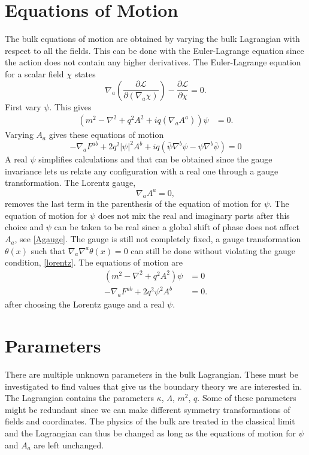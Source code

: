 \documentclass[12pt]{report}
\renewcommand{\i}{\ensuremath{i}}
\begin{document}
\section{Equations of Motion}
The bulk equations of motion are obtained by varying the bulk Lagrangian with respect to all the fields. This can be done with the Euler-Lagrange equation since the action does not contain any higher derivatives. The Euler-Lagrange equation for a scalar field $\chi$ states
\begin{equation}
 \nabla_a\left(\frac{\partial\mathcal{L}}{\partial(\nabla_a\chi)}\right)-\frac{\partial\mathcal{L}}{\partial\chi}=0.
\end{equation}
First vary $\psi$. This gives
\begin{equation}
\begin{split}
\left(m^2-\nabla^2+q^2A^2+\i q(\nabla_aA^a)\right)\psi&=0.
\end{split}
\end{equation}
Varying $A_a$ gives these equations of motion
\begin{equation}
 -\nabla_aF^{ab}+2q^2|\psi|^2A^b+iq\left(\overline{\psi}\nabla^b\psi-\psi\nabla^b\overline{\psi}\right)=0
\end{equation}
A real $\psi$ simplifies calculations and that can be obtained since the gauge invariance lets us relate any configuration with a real one through a gauge transformation. The Lorentz gauge,
\begin{equation}
 \nabla_aA^a=0\label{lorentz},
\end{equation}
removes the last term in the parenthesis of the equation of motion for $\psi$. The equation of motion for $\psi$ does not mix the real and imaginary parts after this choice and $\psi$ can be taken to be real since a global shift of phase does not affect $A_a$, see \eqref{Agauge}. The gauge is still not completely fixed, a gauge transformation $\theta(x)$ such that $\nabla_a\nabla^a\theta(x)=0$ can still be done without violating the gauge condition, \eqref{lorentz}. The equations of motion are
\begin{equation}
\begin{split}
\left(m^2-\nabla^2+q^2A^2\right)\psi&=0\\
-\nabla_aF^{ab}+2q^2\psi^2A^b&=0.
\end{split}\label{eqm}
\end{equation}
after choosing the Lorentz gauge and a real $\psi$.
\section{Parameters}
There are multiple unknown parameters in the bulk Lagrangian. These must be investigated to find values that give us the boundary theory we are interested in. The Lagrangian contains the parameters $\kappa$, $\Lambda$, $m^2$, $q$. Some of these parameters might be redundant since we can make different symmetry transformations of fields and coordinates. The physics of the bulk are treated in the classical limit and the Lagrangian can thus be changed as long as the equations of motion for $\psi$ and $A_a$ are left unchanged.
\end{document}
